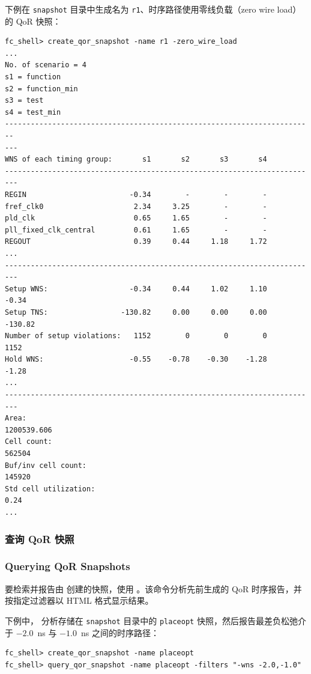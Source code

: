 下例在 \texttt{snapshot} 目录中生成名为 \texttt{r1}、时序路径使用零线负载（zero wire load）的 QoR 快照：
\begin{lstlisting}
fc_shell> create_qor_snapshot -name r1 -zero_wire_load
...
No. of scenario = 4
s1 = function
s2 = function_min
s3 = test
s4 = test_min
------------------------------------------------------------------------
---
WNS of each timing group:       s1       s2       s3       s4
-------------------------------------------------------------------------
REGIN                        -0.34        -        -        -
fref_clk0                     2.34     3.25        -        -
pld_clk                       0.65     1.65        -        -
pll_fixed_clk_central         0.61     1.65        -        -
REGOUT                        0.39     0.44     1.18     1.72
...
-------------------------------------------------------------------------
Setup WNS:                   -0.34     0.44     1.02     1.10     -0.34
Setup TNS:                 -130.82     0.00     0.00     0.00   -130.82
Number of setup violations:   1152        0        0        0      1152
Hold WNS:                    -0.55    -0.78    -0.30    -1.28     -1.28
...
-------------------------------------------------------------------------
Area:                                                       1200539.606
Cell count:                                                      562504
Buf/inv cell count:                                              145920
Std cell utilization:                                              0.24
...
\end{lstlisting}

\subsubsection{查询 QoR 快照}
\subsubsection*{Querying QoR Snapshots}

要检索并报告由  创建的快照，使用 。该命令分析先前生成的 QoR 时序报告，并按指定过滤器以 HTML 格式显示结果。

下例中， 分析存储在 \texttt{snapshot} 目录中的 \texttt{placeopt} 快照，然后报告最差负松弛介于 $-2.0$~ns 与 $-1.0$~ns 之间的时序路径：
\begin{lstlisting}
fc_shell> create_qor_snapshot -name placeopt
fc_shell> query_qor_snapshot -name placeopt -filters "-wns -2.0,-1.0"
\end{lstlisting}


